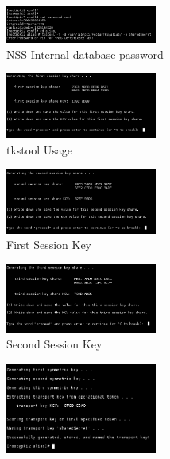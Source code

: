 \documentclass[a4paper]{article}
\begin{document}
\begin{itemize}
\begin{itemize}
\begin{itemize}
                            \begin{figure}[H]
                                \centering
                                \includegraphics[width=50mm]{tkstool-create-sharedSecret1.png}
                                \caption{NSS Internal database password}
                            \end{figure}
                            \begin{figure}[H]
                                \centering
                                \includegraphics[width=50mm]{tkstool-create-sharedSecret2.png}
                                \caption{tkstool Usage}
                            \end{figure}
                            \begin{figure}[H]
                                \centering
                                \includegraphics[width=50mm]{tkstool-create-sharedSecret3.png}
                                \caption{First Session Key}
                            \end{figure}
                            \begin{figure}[H]
                                \centering
                                \includegraphics[width=50mm]{tkstool-create-sharedSecret4.png}
                                \caption{Second Session Key}
                            \end{figure}
                            \begin{figure}[H]
                                \centering
                                \includegraphics[width=50mm]{tkstool-create-sharedSecret5.png}

\end{figure}
\end{itemize}
\end{itemize}
\end{itemize}
\end{document}
